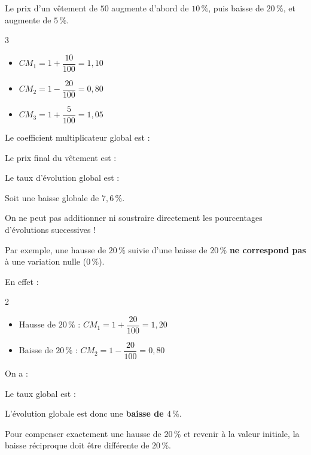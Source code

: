 \begin{ex}
	Le prix d'un vêtement de $50$\eur{} augmente d'abord de $10\,\%$, puis baisse de $20\,\%$, et augmente de $5\,\%$.
	\begin{multicols}{3}
		\begin{itemize}
			\item $CM_1 = 1 + \dfrac{10}{100} = 1{,}10$
			\item $CM_2 = 1 - \dfrac{20}{100} = 0{,}80$
			\item $CM_3 = 1 + \dfrac{5}{100} = 1{,}05$
		\end{itemize}
	\end{multicols}

	Le coefficient multiplicateur global est :


	Le prix final du vêtement est :


	Le taux d'évolution global est :


	Soit une baisse globale de $7{,}6\,\%$.
\end{ex}

\begin{erreur}
	On ne peut pas additionner ni soustraire directement les pourcentages d'évolutions successives !

	Par exemple, une hausse de $20\,\%$ suivie d'une baisse de $20\,\%$ \textbf{ne correspond pas} à une variation nulle ($0\,\%$).

	En effet :
	\begin{multicols}{2}
		\begin{itemize}
			\item Hausse de $20\,\%$ : \quad $CM_1 = 1 + \dfrac{20}{100} = 1{,}20$
			\item Baisse de $20\,\%$ : \quad $CM_2 = 1 - \dfrac{20}{100} = 0{,}80$
		\end{itemize}
	\end{multicols}

	On a : 

	Le taux global est : 

	L'évolution globale est donc une \textbf{baisse de $4\,\%$}.

	Pour compenser exactement une hausse de $20\,\%$ et revenir à la valeur initiale, la baisse réciproque doit être différente de $20\,\%$.
\end{erreur}

